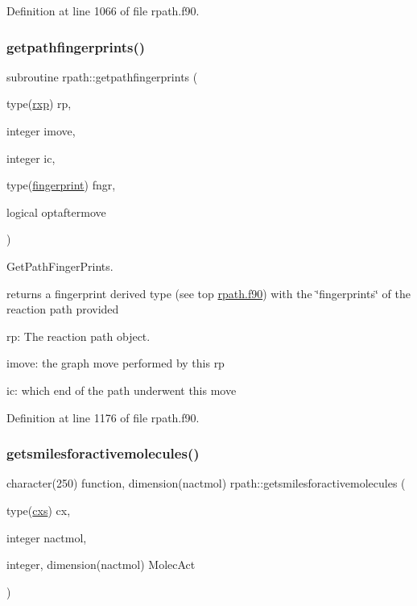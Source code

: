Definition at line 1066 of file rpath.\+f90.

\mbox{\label{namespacerpath_a336b6f37b5f3c99709d0141d4b73eeb5}} 
\subsubsection{\texorpdfstring{getpathfingerprints()}{getpathfingerprints()}\hspace{0.1cm}{\footnotesize\ttfamily [1/2]}}
{\footnotesize\ttfamily subroutine rpath\+::getpathfingerprints (\begin{DoxyParamCaption}\item[{type(\mbox{\hyperlink{structrpath_1_1rxp}{rxp}})}]{rp,  }\item[{integer}]{imove,  }\item[{integer}]{ic,  }\item[{type(\mbox{\hyperlink{structrpath_1_1fingerprint}{fingerprint}})}]{fngr,  }\item[{logical}]{optaftermove }\end{DoxyParamCaption})}



Get\+Path\+Finger\+Prints. 

returns a fingerprint derived type (see top \mbox{\hyperlink{rpath_8f90_source}{rpath.\+f90}}) with the \char`\"{}fingerprints\char`\"{} of the reaction path provided


\begin{DoxyItemize}
\item rp\+: The reaction path object.
\item imove\+: the graph move performed by this rp
\item ic\+: which end of the path underwent this move 
\end{DoxyItemize}

Definition at line 1176 of file rpath.\+f90.

\mbox{\label{namespacerpath_aaae5063ee23b5ff91882fb6eeafd4d05}} 
\subsubsection{\texorpdfstring{getsmilesforactivemolecules()}{getsmilesforactivemolecules()}}
{\footnotesize\ttfamily character(250) function, dimension(nactmol) rpath\+::getsmilesforactivemolecules (\begin{DoxyParamCaption}\item[{type(\mbox{\hyperlink{structchemstr_1_1cxs}{cxs}})}]{cx,  }\item[{integer}]{nactmol,  }\item[{integer, dimension(nactmol)}]{Molec\+Act }\end{DoxyParamCaption})}



